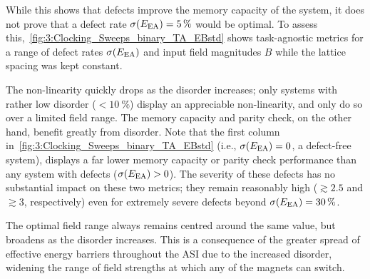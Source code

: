 
While this shows that defects improve the memory capacity of the system, it does not prove that a defect rate $\sigma(E_\mathrm{EA}) = \SI{5}{\percent}$ would be optimal.
To assess this,~\cref{fig:3:Clocking_Sweeps_binary_TA_EBstd} shows task-agnostic metrics for a range of defect rates $\sigma(E_\mathrm{EA})$ and input field magnitudes $B$ while the lattice spacing was kept constant.


The non-linearity quickly drops as the disorder increases; only systems with rather low disorder ($< \SI{10}{\percent}$) display an appreciable non-linearity, and only do so over a limited field range.
The memory capacity and parity check, on the other hand, benefit greatly from disorder.
Note that the first column in~\cref{fig:3:Clocking_Sweeps_binary_TA_EBstd} (i.e., $\sigma(E_\mathrm{EA}) = 0$, a defect-free system), displays a far lower memory capacity or parity check performance than any system with defects ($\sigma(E_\mathrm{EA}) > 0$).
The severity of these defects has no substantial impact on these two metrics; they remain reasonably high ($\gtrsim 2.5$ and $\gtrsim 3$, respectively) even for extremely severe defects beyond $\sigma(E_\mathrm{EA})=\SI{30}{\percent}$. \par
The optimal field range always remains centred around the same value, but broadens as the disorder increases.
This is a consequence of the greater spread of effective energy barriers throughout the ASI due to the increased disorder, widening the range of field strengths at which any of the magnets can switch.

